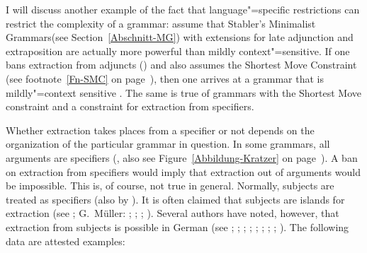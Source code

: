 I will discuss another example of the fact that language"=specific restrictions can restrict the complexity of a grammar:
\citet[Section~3.2]{GM2007a} assume that Stabler's Minimalist Grammars\indexmg (see
Section~\ref{Abschnitt-MG}) with extensions for late adjunction and extraposition are actually more powerful than mildly context"=sensitive.
If one bans extraction from adjuncts (\citealp[]{FG2002a}) and also assumes the Shortest Move Constraint (see footnote~\ref{Fn-SMC} on page~\pageref{Fn-SMC}), then one arrives at a grammar that is mildly"=context sensitive
\citep[]{GM2007a}.
The same is true of grammars with the Shortest Move constraint and a constraint for extraction from specifiers.

Whether extraction takes places from a specifier or not depends on the organization of the particular grammar in question.
In some grammars, all arguments are specifiers (\citealp[--123]{Kratzer96a}, also see
Figure~\ref{Abbildung-Kratzer} on page~\pageref{Abbildung-Kratzer}). A ban on extraction from
specifiers would imply that extraction out of arguments would be impossible. This is, of course, not
true in general. Normally, subjects are treated as specifiers (also by \citet[]{FG2002a}). It is often claimed that subjects
are islands for extraction (see \citealp[, ]{Grewendorf89a}; G.\ Müller: %
\citeyear[]{GMueller96b}; \citeyear[, ]{GMueller98a};
%
\citealp[]{Sabel99a}; \citealp[]{Fanselow2001a}).
Several\label{page-extraction-out-of-subjects} authors have noted, however, that extraction from subjects is possible in German (see \citealp[]{Duerscheid89a}; \citealp*[]{Haider93a};
\citealp{Pafel93b-u}; \citealp[]{Fortmann96a-u}; \citealp[]{Suchsland97a};
\citealp[]{VS98a}; \citealp[]{Ballweg97a}; \citealp[--101]{Mueller99a}; \citealp[]{deKuthy2002a}).
The following data are attested examples:%
